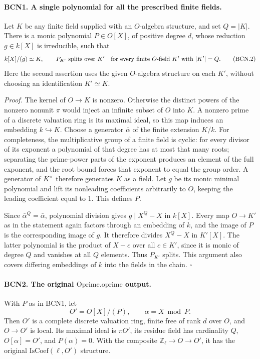 \paragraph{BCN1. A single polynomial for all the prescribed finite fields.}\label{claim:BCN1}
Let \(K\) be any finite field supplied with an \(O\)-algebra structure,
and set \(Q=|K|\).  There is a monic polynomial \(P\in O[X]\), of
positive degree \(d\), whose reduction \(g\in k[X]\) is irreducible,
such that
\[
 k[X]/(g)\simeq K,\qquad
 P_{K'}\text{ splits over }K'
 \quad\hbox{for every finite \(O\)-field \(K'\) with }|K'|=Q .
 \tag{BCN.2}
\]
Here the second assertion uses the given \(O\)-algebra structure
on each \(K'\), without choosing an identification \(K'\simeq K\).

\emph{Proof.}
The kernel of \(O\to K\) is nonzero.  Otherwise the distinct powers
of the nonzero nonunit \(\pi\) would inject an infinite subset of
\(O\) into \(K\).  A nonzero prime of a discrete valuation ring is
its maximal ideal, so this map induces an embedding \(k\hookrightarrow K\).
Choose a generator \(\bar\alpha\) of the finite extension \(K/k\).
For completeness, the multiplicative group of a finite field is
cyclic: for every divisor of its exponent a polynomial of that
degree has at most that many roots; separating the prime-power
parts of the exponent produces an element of the full exponent,
and the root bound forces that exponent to equal the group order.
A generator of \(K^\times\) therefore generates \(K\) as a field.
Let \(g\) be its monic minimal polynomial and lift its nonleading
coefficients arbitrarily to \(O\), keeping the leading coefficient
equal to \(1\).  This defines \(P\).

Since \(\bar\alpha^Q=\bar\alpha\), polynomial division gives
\(g\mid X^Q-X\) in \(k[X]\).  Every map \(O\to K'\) as in the
statement again factors through an embedding of \(k\), and the
image of \(P\) is the corresponding image of \(g\).  It therefore
divides \(X^Q-X\) in \(K'[X]\).  The latter polynomial is the
product of \(X-c\) over all \(c\in K'\), since it is monic of
degree \(Q\) and vanishes at all \(Q\) elements.  Thus \(P_{K'}\)
splits.  This argument also covers differing embeddings of \(k\)
into the fields in the chain.
\hfill\(\square\)

\paragraph{BCN2. The original \(\mathrm{Oprime.oprime}\) output.}\label{claim:BCN2}
With \(P\) as in BCN1, let
\[
 O'=O[X]/(P),\qquad \alpha=X\bmod P .
 \tag{BCN.3}
\]
Then \(O'\) is a complete discrete valuation ring, finite free
of rank \(d\) over \(O\), and \(O\to O'\) is local.  Its maximal
ideal is \(\pi O'\), its residue field has cardinality \(Q\),
\(O[\alpha]=O'\), and \(P(\alpha)=0\).
With the composite \(\mathbb Z_\ell\to O\to O'\), it has the
original \(\mathrm{IsCoef}(\ell,O')\) structure.

